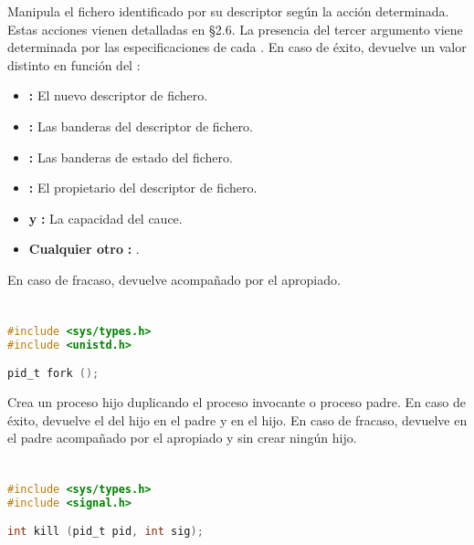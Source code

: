 Manipula el fichero identificado por su descriptor  según la acción  determinada.
Estas acciones vienen detalladas en \S2.6.
La presencia del tercer argumento  viene determinada por las especificaciones de cada .
En caso de éxito, devuelve un valor distinto en función del :

\begin{itemize}
	\item{}\textbf{:} El nuevo descriptor de fichero.
	\item{}\textbf{:} Las banderas del descriptor de fichero.
	\item{}\textbf{:} Las banderas de estado del fichero.
	\item{}\textbf{:} El propietario del descriptor de fichero.
	\item{} \textbf{y} \textbf{:} La capacidad del cauce.
	\item\textbf{Cualquier otro} \textbf{:} .
\end{itemize}

En caso de fracaso, devuelve  acompañado por el  apropiado.

\pagebreak

\section{}\label{fork}

\begin{lstlisting}[language=C]
#include <sys/types.h>
#include <unistd.h>

pid_t fork ();
\end{lstlisting}

Crea un proceso hijo duplicando el proceso invocante o proceso padre.
En caso de éxito, devuelve el  del hijo en el padre y  en el hijo.
En caso de fracaso, devuelve  en el padre acompañado por el  apropiado y sin crear ningún hijo.

\section{}\label{kill}

\begin{lstlisting}[language=C]
#include <sys/types.h>
#include <signal.h>

int kill (pid_t pid, int sig);
\end{lstlisting}

